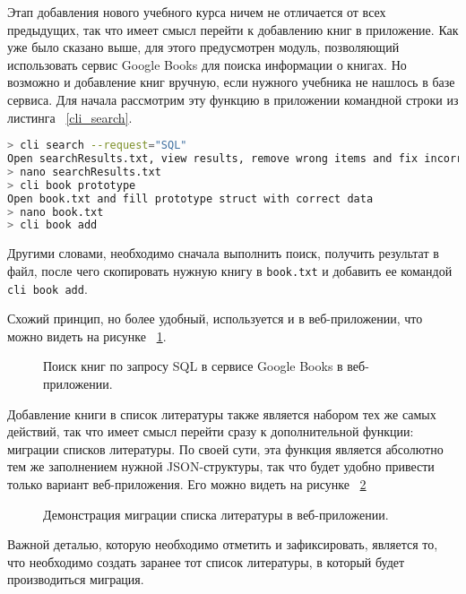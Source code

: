 Этап добавления нового учебного курса ничем не отличается от всех предыдущих, так что имеет смысл перейти к добавлению книг в приложение.
Как уже было сказано выше, для этого предусмотрен модуль, позволяющий использовать сервис Google Books для поиска информации о
книгах. Но возможно и добавление книг вручную, если нужного учебника не нашлось в базе сервиса. 
Для начала рассмотрим эту функцию в приложении командной строки из листинга ~\ref{cli_search}.

\begin{lstlisting}[language=bash, caption = {Поиск книг по запросу SQL в сервисе Google Books в приложении командной строки.}, captionpos=b, label={cli_search}]
> cli search --request="SQL"
Open searchResults.txt, view results, remove wrong items and fix incorrect data.
> nano searchResults.txt 
> cli book prototype
Open book.txt and fill prototype struct with correct data
> nano book.txt
> cli book add
\end{lstlisting}

Другими словами, необходимо сначала выполнить поиск, получить результат в файл, после чего скопировать нужную книгу в
\texttt{book.txt} и добавить ее командой \texttt{cli book add}.

Схожий принцип, но более удобный, используется и в веб-приложении, что можно видеть на рисунке ~\ref{web_search}.

\begin{figure}[h!]
	\caption{Поиск книг по запросу SQL в сервисе Google Books в веб-приложении.}
	\label{web_search}
\end{figure}

Добавление книги в список литературы также является набором тех же самых действий, так что имеет смысл перейти сразу к дополнительной функции:
миграции списков литературы. По своей сути, эта функция является абсолютно тем же заполнением нужной JSON-структуры, так что будет
удобно привести только вариант веб-приложения. Его можно видеть на рисунке ~\ref{web_migrate}

\begin{figure}[h!]
	\caption{Демонстрация миграции списка литературы в веб-приложении.}
	\label{web_migrate}
\end{figure}

Важной деталью, которую необходимо отметить и зафиксировать, является то, что необходимо создать заранее тот список литературы, в который
будет производиться миграция.

